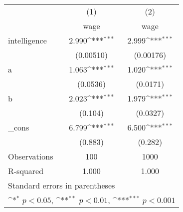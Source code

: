 {
\def\sym#1{\ifmmode^{#1}\else\(^{#1}\)\fi}
\begin{tabular}{l*{2}{c}}
\hline\hline
            &\multicolumn{1}{c}{(1)}&\multicolumn{1}{c}{(2)}\\
            &\multicolumn{1}{c}{wage}&\multicolumn{1}{c}{wage}\\
\hline
intelligence&       2.990\sym{***}&       2.999\sym{***}\\
            &   (0.00510)         &   (0.00176)         \\
[1em]
a           &       1.063\sym{***}&       1.020\sym{***}\\
            &    (0.0536)         &    (0.0171)         \\
[1em]
b           &       2.023\sym{***}&       1.979\sym{***}\\
            &     (0.104)         &    (0.0327)         \\
[1em]
\_cons      &       6.799\sym{***}&       6.500\sym{***}\\
            &     (0.883)         &     (0.282)         \\
\hline
Observations&         100         &        1000         \\
R-squared   &       1.000         &       1.000         \\
\hline\hline
\multicolumn{3}{l}{\footnotesize Standard errors in parentheses}\\
\multicolumn{3}{l}{\footnotesize \sym{*} \(p<0.05\), \sym{**} \(p<0.01\), \sym{***} \(p<0.001\)}\\
\end{tabular}
}
